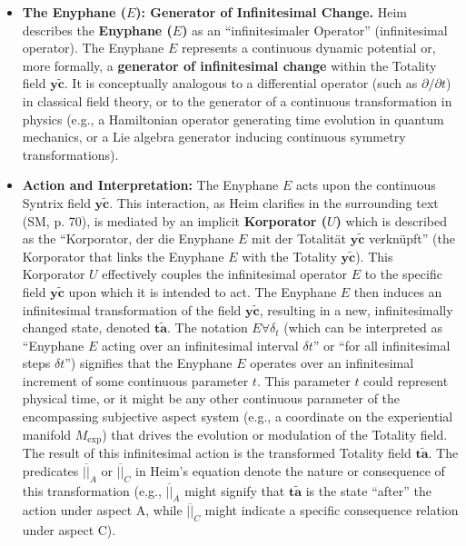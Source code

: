 \documentclass[
    12pt,              %
    a4paper,           %
    headings=normal,   %
    twoside=true,      %
    BCOR=8mm,          %
]{scrbook}
\newcommand{\q}[1]{\enquote{#1}}
\newcommand{\enyphane}{E}
\newcommand{\Mexp}{M_{\text{exp}}}
\begin{document}
\begin{itemize}
    \item   \textbf{The Enyphane (\(\enyphane\)): Generator of Infinitesimal Change.}
        Heim describes the \textbf{Enyphane (\(\enyphane\))} as an \q{infinitesimaler Operator} (infinitesimal operator). The Enyphane \(\enyphane\) represents a continuous dynamic potential or, more formally, a \textbf{generator of infinitesimal change} within the Totality field \(\bm{y\widetilde{c}}\). It is conceptually analogous to a differential operator (such as \(\partial/\partial t\)) in classical field theory, or to the generator of a continuous transformation in physics (e.g., a Hamiltonian operator generating time evolution in quantum mechanics, or a Lie algebra generator inducing continuous symmetry transformations).

    \item   \textbf{Action and Interpretation:}
        The Enyphane \(\enyphane\) acts upon the continuous Syntrix field \(\bm{y\widetilde{c}}\). This interaction, as Heim clarifies in the surrounding text (SM, p. 70), is mediated by an implicit \textbf{Korporator (\(U\))} which is described as the ``Korporator, der die Enyphane \(E\) mit der Totalität \(\bm{y\widetilde{c}}\) verknüpft'' (the Korporator that links the Enyphane \(E\) with the Totality \(\bm{y\widetilde{c}}\)). This Korporator \(U\) effectively couples the infinitesimal operator \(\enyphane\) to the specific field \(\bm{y\widetilde{c}}\) upon which it is intended to act.
        The Enyphane \(\enyphane\) then induces an infinitesimal transformation of the field \(\bm{y\widetilde{c}}\), resulting in a new, infinitesimally changed state, denoted \(\bm{t\widetilde{a}}\). The notation \(\enyphane\forall\delta_t\) (which can be interpreted as ``Enyphane \(\enyphane\) acting over an infinitesimal interval \(\delta t\)'' or ``for all infinitesimal steps \(\delta t\)'') signifies that the Enyphane \(\enyphane\) operates over an infinitesimal increment of some continuous parameter \(t\). This parameter \(t\) could represent physical time, or it might be any other continuous parameter of the encompassing subjective aspect system (e.g., a coordinate on the experiential manifold \(\Mexp\)) that drives the evolution or modulation of the Totality field. The result of this infinitesimal action is the transformed Totality field \(\bm{t\widetilde{a}}\). The predicates \(\overline{||}_A\) or \(\overline{||}_C\) in Heim's equation denote the nature or consequence of this transformation (e.g., \(\overline{||}_A\) might signify that \(\bm{t\widetilde{a}}\) is the state ``after'' the action under aspect A, while \(\overline{||}_C\) might indicate a specific consequence relation under aspect C).
\end{itemize}
\end{document}
